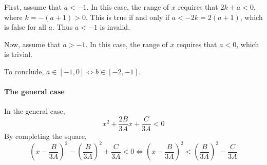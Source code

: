 \documentclass[a4paper, 11pt]{scrartcl}
\begin{document}
First, assume that $a < -1$. In this case, the range of $x$ requires that $2k + a < 0$, where $k = -(a + 1) > 0$. This is true if and only if $a < -2k = 2(a + 1)$, which is false for all $a$. Thus $a < -1$ is invalid.

Now, assume that $a > -1$. In this case, the range of $x$ requires that $a < 0$, which is trivial.

To conclude, $a\in[-1, 0] \iff b\in[-2, -1]$.


\paragraph{The general case}
In the general case,
\[
x^2 +\frac{2B}{3A}x + \frac{C}{3A} < 0
\]
By completing the square,
\[
 \left(x - \frac{B}{3A}\right)^2 - \left(\frac{B}{3A}\right)^2 + \frac{C}{3A} < 0 \iff \left(x - \frac{B}{3A}\right)^2  < \left(\frac{B}{3A}\right)^2 - \frac{C}{3A}
\]
\end{document}

